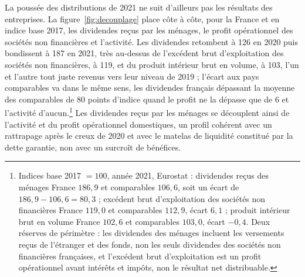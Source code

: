 La poussée des distributions de 2021 ne suit d'ailleurs pas les résultats des entreprises. La
figure~\ref{fig:decouplage} place côte à côte, pour la France et en indice base 2017, les dividendes
reçus par les ménages, le profit opérationnel des sociétés non financières et l'activité. Les
dividendes retombent à 126 en 2020 puis bondissent à 187 en 2021, très au-dessus de l'excédent brut
d'exploitation des sociétés non financières, à 119, et du produit intérieur brut en volume, à 103,
l'un et l'autre tout juste revenus vers leur niveau de 2019 ; l'écart aux pays comparables va dans le
même sens, les dividendes français dépassant la moyenne des comparables de 80 points d'indice quand
le profit ne la dépasse que de 6 et l'activité d'aucun.\footnote{Indices base 2017 $= 100$, année
2021, Eurostat : dividendes reçus des ménages France $186{,}9$ et comparables $106{,}6$, soit un
écart de $186{,}9 - 106{,}6 = 80{,}3$ ; excédent brut d'exploitation des sociétés non financières
France $119{,}0$ et comparables $112{,}9$, écart $6{,}1$ ; produit intérieur brut en volume France
$102{,}6$ et comparables $103{,}0$, écart $-0{,}4$. Deux réserves de périmètre : les dividendes des
ménages incluent les versements reçus de l'étranger et des fonds, non les seuls dividendes des
sociétés non financières françaises, et l'excédent brut d'exploitation est un profit opérationnel
avant intérêts et impôts, non le résultat net distribuable.} Les dividendes reçus par les ménages se
découplent ainsi de l'activité et du profit opérationnel domestiques, un profil cohérent avec un
rattrapage après le creux de 2020 et avec le matelas de liquidité constitué par la dette garantie,
non avec un surcroît de bénéfices.




